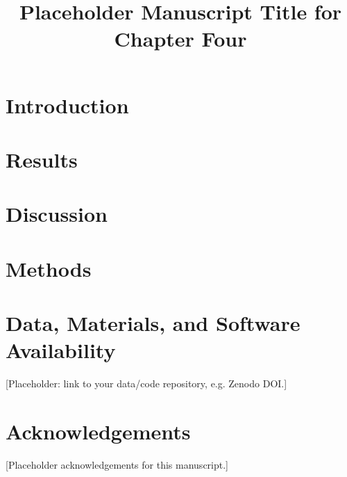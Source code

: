 \documentclass[../main.tex]{subfiles}
\title{Placeholder Manuscript Title for Chapter Four}
\affil{a}{Your Institute, Your Department, Your University, City, Country}
\begin{document}
\manuscriptfront

\section{Introduction}


\section{Results}


\section{Discussion}


\section{Methods}


\section*{Data, Materials, and Software Availability}
[Placeholder: link to your data/code repository, e.g. Zenodo DOI.]

\section*{Acknowledgements}
[Placeholder acknowledgements for this manuscript.]
\end{document}
